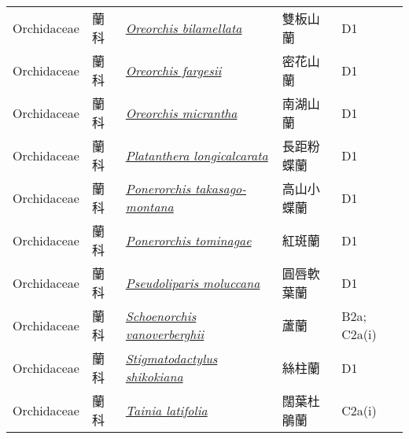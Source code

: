 {\begin{longtable}{p{2.5cm}p{2cm}p{5cm}p{2.5cm}p{3cm}}
    Orchidaceae & 蘭科 & \href{http://www.theplantlist.org/tpl1.1/search?q=Oreorchis+bilamellata}{\textit{Oreorchis bilamellata} } & 雙板山蘭 & D1 \index{Oreorchis@\textit{Oreorchis}!bilamellata@\textit{bilamellata}}  \index{雙板山蘭} \\
    Orchidaceae & 蘭科 & \href{http://www.theplantlist.org/tpl1.1/search?q=Oreorchis+fargesii}{\textit{Oreorchis fargesii} } & 密花山蘭 & D1 \index{Oreorchis@\textit{Oreorchis}!fargesii@\textit{fargesii}}  \index{密花山蘭} \\
    Orchidaceae & 蘭科 & \href{http://www.theplantlist.org/tpl1.1/search?q=Oreorchis+micrantha}{\textit{Oreorchis micrantha} } & 南湖山蘭 & D1 \index{Oreorchis@\textit{Oreorchis}!micrantha@\textit{micrantha}}  \index{南湖山蘭} \\
    Orchidaceae & 蘭科 & \href{http://www.theplantlist.org/tpl1.1/search?q=Platanthera+longicalcarata}{\textit{Platanthera longicalcarata} } & 長距粉蝶蘭 & D1 \index{Platanthera@\textit{Platanthera}!longicalcarata@\textit{longicalcarata}}  \index{長距粉蝶蘭} \\
    Orchidaceae & 蘭科 & \href{http://www.theplantlist.org/tpl1.1/search?q=Ponerorchis+takasago-montana}{\textit{Ponerorchis takasago-montana} } & 高山小蝶蘭 & D1 \index{Ponerorchis@\textit{Ponerorchis}!takasago-montana@\textit{takasago-montana}}  \index{高山小蝶蘭} \\
    Orchidaceae & 蘭科 & \href{http://www.theplantlist.org/tpl1.1/search?q=Ponerorchis+tominagae}{\textit{Ponerorchis tominagae} } & 紅斑蘭 & D1 \index{Ponerorchis@\textit{Ponerorchis}!tominagae@\textit{tominagae}}  \index{紅斑蘭} \\
    Orchidaceae & 蘭科 & \href{http://www.theplantlist.org/tpl1.1/search?q=Pseudoliparis+moluccana}{\textit{Pseudoliparis moluccana} } & 圓唇軟葉蘭 & D1 \index{Pseudoliparis@\textit{Pseudoliparis}!moluccana@\textit{moluccana}}  \index{圓唇軟葉蘭} \\
    Orchidaceae & 蘭科 & \href{http://www.theplantlist.org/tpl1.1/search?q=Schoenorchis+vanoverberghii}{\textit{Schoenorchis vanoverberghii} } & 蘆蘭 & B2a; C2a(i) \index{Schoenorchis@\textit{Schoenorchis}!vanoverberghii@\textit{vanoverberghii}}  \index{蘆蘭} \\
    Orchidaceae & 蘭科 & \href{http://www.theplantlist.org/tpl1.1/search?q=Stigmatodactylus+shikokiana}{\textit{Stigmatodactylus shikokiana} } & 絲柱蘭 & D1 \index{Stigmatodactylus@\textit{Stigmatodactylus}!shikokiana@\textit{shikokiana}}  \index{絲柱蘭} \\
    Orchidaceae & 蘭科 & \href{http://www.theplantlist.org/tpl1.1/search?q=Tainia+latifolia}{\textit{Tainia latifolia} } & 闊葉杜鵑蘭 & C2a(i) \index{Tainia@\textit{Tainia}!latifolia@\textit{latifolia}}  \index{闊葉杜鵑蘭} \\

\end{longtable}}
